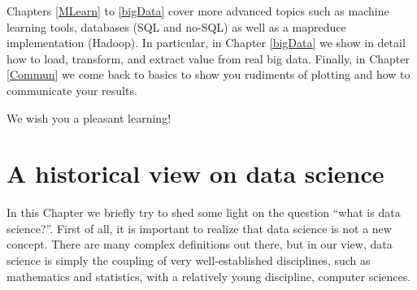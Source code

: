 \documentclass[10pt]{PhDthesisPSnPDF}%
\begin{document}
Chapters \ref{MLearn} to \ref{bigData} cover more advanced topics such as machine learning tools, databases (SQL and no-SQL) as well as a mapreduce implementation (Hadoop). In particular, in Chapter \ref{bigData} we show in detail how to load, transform, and extract value from real big data. Finally, in Chapter \ref{Commun} we come back to basics to show you rudiments of plotting and how to communicate your results. 

We wish you a pleasant learning!

\newpage
\thispagestyle{empty}
\mbox{}
\cleardoublepage

\setcounter{tocdepth}{2}




\setcounter{secnumdepth}{3} %
\setcounter{tocdepth}{2}    %
\tableofcontents            %


	


\cleardoublepage
\newpage
{}	 %


\chapter{A historical view on data science}\label{DS} 

In this Chapter we briefly try to shed some light on the question ``what is data science?''. First of all, it is important to realize that data science is not a new concept. There are many complex definitions out there, but in our view, data science is simply the coupling of very well-established disciplines, such as mathematics and statistics, with a relatively young discipline, computer sciences. 
\end{document}
